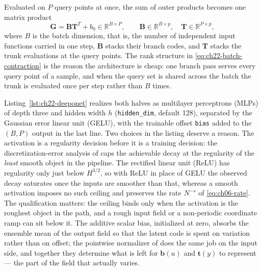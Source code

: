 Evaluated on $P$ query points at once, the sum of outer products becomes one matrix product
\begin{equation}
  \label{eq:ch22-batch-contraction}
  \mathbf{G} = \mathbf{B} \mathbf{T}^T + b_0 \in \mathbb{R}^{B \times P}, \qquad \mathbf{B} \in \mathbb{R}^{B \times p}, \quad \mathbf{T} \in \mathbb{R}^{P \times p},
\end{equation}
where $B$ is the batch dimension, that is, the number of independent input functions carried
in one step, $\mathbf{B}$ stacks their branch codes, and $\mathbf{T}$ stacks the trunk
evaluations at the query points. The rank structure in \eqref{eq:ch22-batch-contraction} is
the reason the architecture is cheap: one branch pass serves every query point of a sample,
and when the query set is shared across the batch the trunk is evaluated once per step rather
than $B$ times.

Listing~\ref{lst:ch22-deeponet} realizes both halves as multilayer perceptrons (MLPs) of depth
three and hidden width $h$ (\texttt{hidden\_dim}, default 128), separated by the Gaussian
error linear unit (GELU), with the trainable offset \texttt{bias} added to the $(B,P)$ output
in the last line. Two choices in the listing deserve a reason. The activation is a regularity
decision before it is a training decision: the discretization-error analysis of
 caps the achievable decay at the
regularity of the \emph{least} smooth object in the pipeline. The rectified linear unit (ReLU)
has regularity only just below $H^{3/2}$, so with ReLU in place of GELU the observed decay
saturates once the inputs are smoother than that, whereas a smooth activation imposes no such
ceiling and preserves the rate $N^{-s}$ of \eqref{eq:ch06-rate}. The qualification matters:
the ceiling binds only when the activation is the roughest object in the path, and a rough
input field or a non-periodic coordinate ramp can sit below it. The additive scalar bias,
initialized at zero, absorbs the ensemble mean of the output field so that the latent code is
spent on variation rather than on offset; the pointwise normalizer of
 does the same job on the input
side, and together they determine what is left for $\mathbf{b}(u)$ and $\mathbf{t}(y)$ to
represent --- the part of the field that actually varies.


